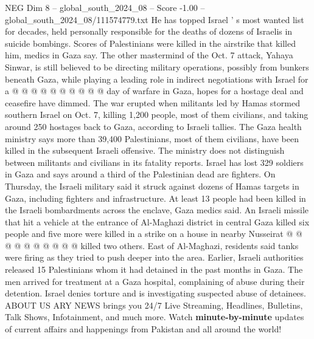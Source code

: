 \begin{textsample}{NEG Dim 8 – global\_south\_2024\_08 – Score -1.00 – global\_south\_2024\_08/111574779.txt}
He has topped Israel ' s most wanted list for decades, held personally responsible for the deaths of dozens of Israelis in suicide bombings.
Scores of Palestinians were killed in the airstrike that killed him, medics in Gaza say.
The other mastermind of the Oct. 7 attack, Yahaya Sinwar, is still believed to be directing military operations, possibly from bunkers beneath Gaza, while playing a leading role in indirect negotiations with Israel for a @ @ @ @ @ @ @ @ @ @ day of warfare in Gaza, hopes for a hostage deal and ceasefire have dimmed.
The war erupted when militants led by Hamas stormed southern Israel on Oct. 7, killing 1,200 people, most of them civilians, and taking around 250 hostages back to Gaza, according to Israeli tallies.
The Gaza health ministry says more than 39,400 Palestinians, most of them civilians, have been killed in the subsequent Israeli offensive.
The ministry does not distinguish between militants and civilians in its fatality reports.
Israel has lost 329 soldiers in Gaza and says around a third of the Palestinian dead are fighters.
On Thursday, the Israeli military said it struck against dozens of Hamas targets in Gaza, including fighters and infrastructure.
At least 13 people had been killed in the Israeli bombardments across the enclave, Gaza medics said.
An Israeli missile that hit a vehicle at the entrance of Al-Maghazi district in central Gaza killed six people and five more were killed in a strike on a house in nearby Nusseirat @ @ @ @ @ @ @ @ @ @ killed two others.
East of Al-Maghazi, residents said tanks were firing as they tried to push deeper into the area.
Earlier, Israeli authorities released 15 Palestinians whom it had detained in the past months in Gaza.
The men arrived for treatment at a Gaza hospital, complaining of abuse during their detention.
Israel denies torture and is investigating suspected abuse of detainees.
ABOUT US ARY NEWS brings you 24/7 Live Streaming, Headlines, Bulletins, Talk Shows, Infotainment, and much more.
Watch \textbf{minute-by-minute} updates of current affairs and happenings from Pakistan and all around the world!

\end{textsample}

